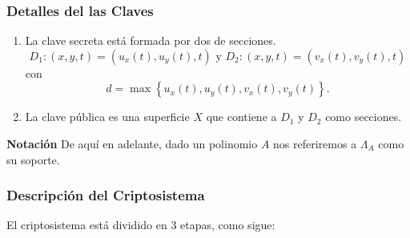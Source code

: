 \documentclass[11pt]{article}
\newcommand{\izq}{\left\{ }
\newcommand{\der}{\right\} }
\numberwithin{equation}{section} %
\numberwithin{figure}{section} %
\numberwithin{table}{section} %
\begin{document}
			\subsubsection{Detalles del las Claves}
				\begin{enumerate}
					\item La clave secreta est\'a formada por dos de secciones.
						$$
							D_1 : (x,y,t)=(u_x(t),u_y(t),t)\text{ y  }D_2 : (x,y,t)=(v_x(t),v_y(t),t)
						$$
						con
						$$
							d=\max\izq u_x(t),u_y(t),v_x(t),v_y(t)\der.
						$$
					\item La clave p\'ublica es una superficie $X$ que contiene a $D_1$ y $D_2$ como secciones.
				\end{enumerate}

			\textbf{Notaci\'on} De aqu\'i en adelante, dado un polinomio $A$ nos referiremos a $\Lambda_A$ como su soporte.
			
			
			\subsubsection{Descripci\'on del Criptosistema}
			\label{222DESCVA1}
				El criptosistema est\'a dividido en 3 etapas, como sigue:
\end{document}
